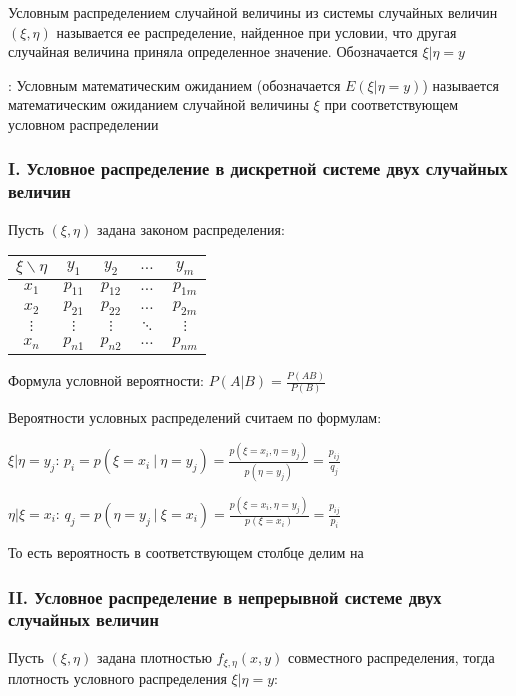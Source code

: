 \documentclass[12pt]{article}
\begin{document}
    \Def Условным распределением случайной величины из системы случайных величин $(\xi, \eta)$ 
    называется ее распределение, найденное при условии, что другая случайная величина приняла 
    определенное значение. Обозначается $\xi | \eta = y$

    : Условным математическим ожиданием (обозначается $E(\xi | \eta = y)$) называется 
    математическим ожиданием случайной величины $\xi$ при соответствующем условном распределении

    \subsubsection{I. Условное распределение в дискретной системе двух случайных величин}

    Пусть $(\xi, \eta)$ задана законом распределения:

    \begin{tabular}{c|c|c|c|c}
        $\xi \backslash \eta$ & $y_1$ & $y_2$ & $\dots$ & $y_m$ \\
        \hline
        $x_1$ & $p_{11}$ & $p_{12}$ & $\dots$ & $p_{1m}$ \\
        \hline
        $x_2$ & $p_{21}$ & $p_{22}$ & $\dots$ & $p_{2m}$ \\
        \hline
        $\vdots$ & $\vdots$ & $\vdots$ & $\ddots$ & $\vdots$ \\
        \hline
        $x_n$ & $p_{n1}$ & $p_{n2}$ & $\dots$ & $p_{nm}$ \\
    \end{tabular}

    Формула условной вероятности: $P(A | B) = \frac{P(AB)}{P(B)}$

    Вероятности условных распределений считаем по формулам:

    $\xi | \eta = y_j$: $p_i = p(\xi = x_i \ | \ \eta = y_j) = \frac{p(\xi = x_i, \eta = y_j)}{p(\eta = y_j)} = \frac{p_{ij}}{q_j}$

    $\eta | \xi = x_i$: $q_j = p(\eta = y_j \ | \ \xi = x_i) = \frac{p(\xi = x_i, \eta = y_j)}{p(\xi = x_i)} = \frac{p_{ij}}{p_i}$

    То есть вероятность в соответствующем столбце делим на 

    \subsubsection{II. Условное распределение в непрерывной системе двух случайных величин}

    Пусть $(\xi, \eta)$ задана плотностью $f_{\xi, \eta}(x, y)$ совместного распределения, тогда плотность 
    условного распределения $\xi | \eta = y$: 
\end{document}
